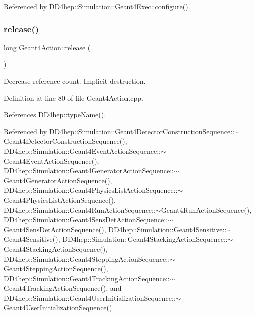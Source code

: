 Referenced by D\+D4hep\+::\+Simulation\+::\+Geant4\+Exec\+::configure().

\hypertarget{class_d_d4hep_1_1_simulation_1_1_geant4_action_a3afba3ee937fdbd25d27994e4e75c5ac}{}\label{class_d_d4hep_1_1_simulation_1_1_geant4_action_a3afba3ee937fdbd25d27994e4e75c5ac} 
\subsubsection{\texorpdfstring{release()}{release()}}
{\footnotesize\ttfamily long Geant4\+Action\+::release (\begin{DoxyParamCaption}{ }\end{DoxyParamCaption})}



Decrease reference count. Implicit destruction. 



Definition at line 80 of file Geant4\+Action.\+cpp.



References D\+D4hep\+::type\+Name().



Referenced by D\+D4hep\+::\+Simulation\+::\+Geant4\+Detector\+Construction\+Sequence\+::$\sim$\+Geant4\+Detector\+Construction\+Sequence(), D\+D4hep\+::\+Simulation\+::\+Geant4\+Event\+Action\+Sequence\+::$\sim$\+Geant4\+Event\+Action\+Sequence(), D\+D4hep\+::\+Simulation\+::\+Geant4\+Generator\+Action\+Sequence\+::$\sim$\+Geant4\+Generator\+Action\+Sequence(), D\+D4hep\+::\+Simulation\+::\+Geant4\+Physics\+List\+Action\+Sequence\+::$\sim$\+Geant4\+Physics\+List\+Action\+Sequence(), D\+D4hep\+::\+Simulation\+::\+Geant4\+Run\+Action\+Sequence\+::$\sim$\+Geant4\+Run\+Action\+Sequence(), D\+D4hep\+::\+Simulation\+::\+Geant4\+Sens\+Det\+Action\+Sequence\+::$\sim$\+Geant4\+Sens\+Det\+Action\+Sequence(), D\+D4hep\+::\+Simulation\+::\+Geant4\+Sensitive\+::$\sim$\+Geant4\+Sensitive(), D\+D4hep\+::\+Simulation\+::\+Geant4\+Stacking\+Action\+Sequence\+::$\sim$\+Geant4\+Stacking\+Action\+Sequence(), D\+D4hep\+::\+Simulation\+::\+Geant4\+Stepping\+Action\+Sequence\+::$\sim$\+Geant4\+Stepping\+Action\+Sequence(), D\+D4hep\+::\+Simulation\+::\+Geant4\+Tracking\+Action\+Sequence\+::$\sim$\+Geant4\+Tracking\+Action\+Sequence(), and D\+D4hep\+::\+Simulation\+::\+Geant4\+User\+Initialization\+Sequence\+::$\sim$\+Geant4\+User\+Initialization\+Sequence().

